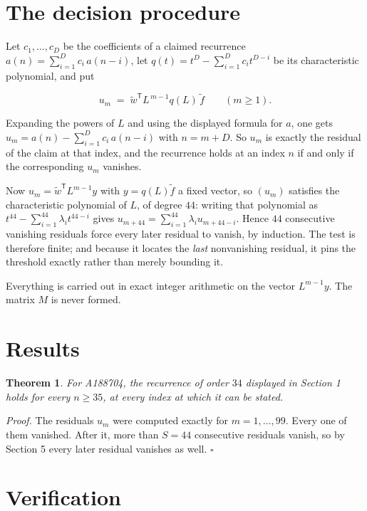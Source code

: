\documentclass[11pt]{article}
\newtheorem{theorem}{Theorem}
\theoremstyle{definition}
\begin{document}
\section{The decision procedure}

Let $c_1,\dots,c_D$ be the coefficients of a claimed recurrence $a(n) = \sum_{i=1}^{D} c_i\,a(n-i)$, let $q(t) = t^{D} - \sum_{i=1}^{D} c_i t^{D-i}$ be its characteristic polynomial, and put

\[u_m \;=\; \tilde w^{\mathsf T} L^{\,m-1} q(L)\,\tilde f \qquad (m \ge 1).\]

Expanding the powers of $L$ and using the displayed formula for $a$, one gets $u_m = a(n) - \sum_{i=1}^{D} c_i\,a(n-i)$ with $n = m + D$. So $u_m$ is exactly the residual of the claim at that index, and the recurrence holds at an index $n$ if and only if the corresponding $u_m$ vanishes.

Now $u_m = \tilde w^{\mathsf T} L^{m-1} y$ with $y = q(L)\tilde f$ a fixed vector, so $(u_m)$ satisfies the characteristic polynomial of $L$, of degree $44$: writing that polynomial as $t^{44} - \sum_{i=1}^{44} \lambda_i t^{44-i}$ gives $u_{m+44} = \sum_{i=1}^{44} \lambda_i u_{m+44-i}$. Hence $44$ consecutive vanishing residuals force every later residual to vanish, by induction. The test is therefore finite; and because it locates the {\itshape last} nonvanishing residual, it pins the threshold exactly rather than merely bounding it.

Everything is carried out in exact integer arithmetic on the vector $L^{m-1}y$. The matrix $M$ is never formed.

\section{Results}

\begin{theorem} For A188704, the recurrence of order $34$ displayed in Section 1 holds for every $n \ge 35$, at every index at which it can be stated.\end{theorem}

{\itshape Proof.} The residuals $u_m$ were computed exactly for $m = 1,\dots,99$. Every one of them vanished. After it, more than $S = 44$ consecutive residuals vanish, so by Section 5 every later residual vanishes as well. $\square$

\section{Verification}
\end{document}
